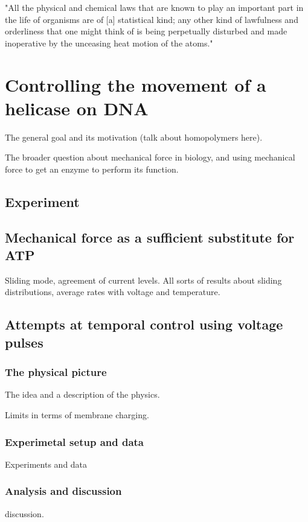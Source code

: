 \begin{savequote}[75mm]
"All the physical and chemical laws that are known to play an important part in the life of organisms are of [a] statistical kind; any other kind of lawfulness and orderliness that one might think of is being perpetually disturbed and made inoperative by the unceasing heat motion of the atoms."
\end{savequote}

\chapter{Controlling the movement of a helicase on DNA}
\label{helicase_motion_control}

The general goal and its motivation (talk about homopolymers here).

The broader question about mechanical force in biology, and using mechanical force to get an enzyme to perform its function.

\section{Experiment}

\section{Mechanical force as a sufficient substitute for ATP}

Sliding mode, agreement of current levels.  All sorts of results about sliding distributions, average rates with voltage and temperature.

\section{Attempts at temporal control using voltage pulses}

\subsection{The physical picture}
The idea and a description of the physics.

Limits in terms of membrane charging.

\subsection{Experimetal setup and data}

Experiments and data

\subsection{Analysis and discussion}

discussion.